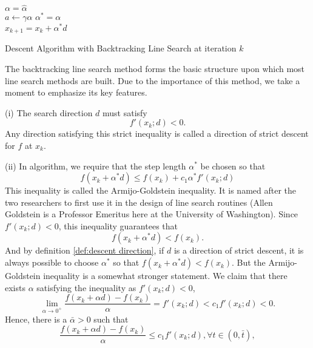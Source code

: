 \begin{algorithm}[H]
    \BlankLine
    $\alpha=\hat{\alpha}$\\
     {
        $a\leftarrow \gamma\alpha$\;
    }
    $\alpha^*=\alpha$\\
    \Return $x_{k+1}=x_k+\alpha^* d$
    \caption{Descent Algorithm with Backtracking Line Search at iteration $k$}
    \label{alg:bls}
\end{algorithm}
The backtracking line search method forms the basic structure upon which most line search
methods are built. Due to the importance of this method, we take a moment to emphasize
its key features.
\par
(i) The search direction $d$ must satisfy
\begin{equation*}
    f'(x_k;d)<0. 
\end{equation*}
Any direction satisfying this strict inequality is called a direction of strict descent for
$f$ at $x_k$.
\par 
(ii) In algorithm, we require that the step length $\alpha^*$ be chosen so that
\begin{equation*}
    f(x_k+\alpha^* d)\leq f(x_k) + c_1\alpha^* f'(x_k;d)
\end{equation*}
This inequality is called the Armijo-Goldstein inequality. It is named after the two
researchers to first use it in the design of line search routines (Allen Goldstein is a Professor Emeritus here at the University of Washington). 
Since $f'(x_k;d)<0$, this inequality
guarantees that
    \begin{equation*}
        f(x_k+\alpha^* d)< f(x_k). 
    \end{equation*}
And by definition \ref{def:descent direction}, if $d$ is a direction of strict descent, 
it is always possible to choose $\alpha^*$ so that $f(x_k+\alpha^* d)< f(x_k)$.  
But the Armijo-Goldstein inequality is a somewhat stronger statement. We claim that there exists $\alpha$ satisfying the inequality as $f'(x_k;d)<0$, 
\begin{equation*}
    \lim_{\alpha\rightarrow 0^+} \frac{f(x_k+\alpha d)-f(x_k)}{\alpha} = f'(x_k;d)<c_1f'(x_k;d)<0. 
\end{equation*}
Hence, there is a $\bar{\alpha}>0$ such that 
\begin{equation*}
    \frac{f(x_k+\alpha d)-f(x_k)}{\alpha} \leq c_1f'(x_k;d), \forall t\in (0,\bar{t}),
\end{equation*}
